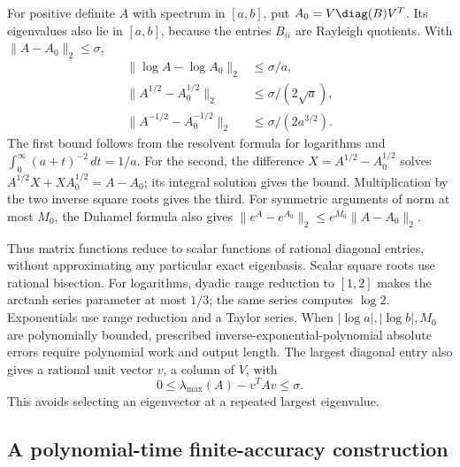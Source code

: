 For positive definite $A$ with spectrum in $[a,b]$, put
$A_0=V\diag(B)V^T$. Its eigenvalues also lie in $[a,b]$, because the
entries $B_{ii}$ are Rayleigh quotients. With $\|A-A_0\|_2\le\sigma$,
\begin{equation}\label{eq:matrix-function-bounds}
 \begin{split}
 \|\log A-\log A_0\|_2&\le\sigma/a,\\
 \|A^{1/2}-A_0^{1/2}\|_2&\le\sigma/(2\sqrt a),\\
 \|A^{-1/2}-A_0^{-1/2}\|_2&\le\sigma/(2a^{3/2}).
 \end{split}
\end{equation}
The first bound follows from the resolvent formula for logarithms and
$\int_0^\infty(a+t)^{-2}\,dt=1/a$. For the second, the difference
$X=A^{1/2}-A_0^{1/2}$ solves
$A^{1/2}X+XA_0^{1/2}=A-A_0$; its integral solution gives the bound.
Multiplication by the two inverse square roots gives the third. For
symmetric arguments of norm at most $M_0$, the Duhamel formula also gives
$\|e^A-e^{A_0}\|_2\le e^{M_0}\|A-A_0\|_2$.

Thus matrix functions reduce to scalar functions of rational diagonal
entries, without approximating any particular exact eigenbasis. Scalar
square roots use rational bisection. For logarithms, dyadic range reduction
to $[1,2]$ makes the arctanh series parameter at most $1/3$; the same
series computes $\log2$. Exponentials use range reduction and a Taylor
series. When $|\log a|,|\log b|,M_0$ are polynomially bounded, prescribed
inverse-exponential-polynomial absolute errors require polynomial work
and output length. The largest diagonal entry also gives a rational
unit vector $v$, a column of $V$, with
\begin{equation}\label{eq:rayleigh-residual}
 0\le\lambda_{\max}(A)-v^TAv\le\sigma.
\end{equation}
This avoids selecting an eigenvector at a repeated largest eigenvalue.

\subsection{A polynomial-time finite-accuracy construction}

